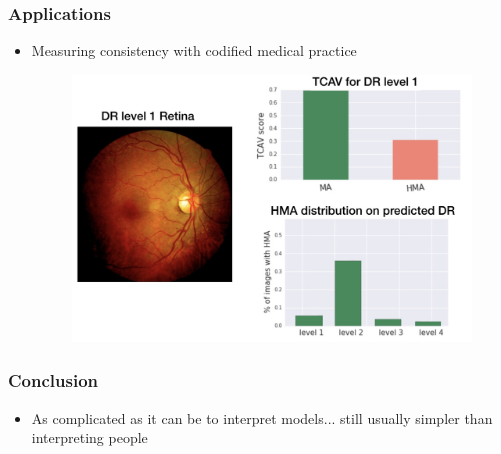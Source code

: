 \documentclass[10pt,mathserif]{beamer}
\begin{document}
\begin{frame}
  \frametitle{Applications}
  \begin{itemize}
  \item Measuring consistency with codified medical practice
    \begin{figure}[ht]
      \centering
      \includegraphics[width=0.7\paperwidth]{figure/cav_app1}
    \end{figure}
  \end{itemize}  
\end{frame}

\begin{frame}
  \frametitle{Conclusion}
\begin{itemize}
\item As complicated as it can be to interpret models... still usually simpler
  than interpreting people
\end{itemize}
\end{frame}


\end{document}
